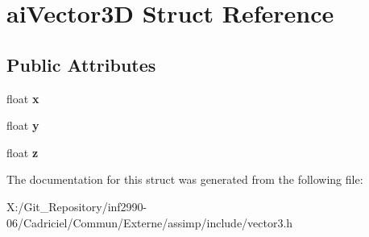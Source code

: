 \hypertarget{structai_vector3_d}{\section{ai\-Vector3\-D Struct Reference}
\label{structai_vector3_d}
}
\subsection*{Public Attributes}
\begin{DoxyCompactItemize}
\item 
\hypertarget{structai_vector3_d_a3762d39eeb99def9ebd413b2bb8dd470}{float {\bfseries x}}\label{structai_vector3_d_a3762d39eeb99def9ebd413b2bb8dd470}

\item 
\hypertarget{structai_vector3_d_ac7b5fcc03324f8c3bc8429c95882dfb8}{float {\bfseries y}}\label{structai_vector3_d_ac7b5fcc03324f8c3bc8429c95882dfb8}

\item 
\hypertarget{structai_vector3_d_a2b93b892064995e8d24f4e3352175aae}{float {\bfseries z}}\label{structai_vector3_d_a2b93b892064995e8d24f4e3352175aae}

\end{DoxyCompactItemize}


The documentation for this struct was generated from the following file\-:\begin{DoxyCompactItemize}
\item 
X\-:/\-Git\-\_\-\-Repository/inf2990-\/06/\-Cadriciel/\-Commun/\-Externe/assimp/include/vector3.\-h\end{DoxyCompactItemize}
